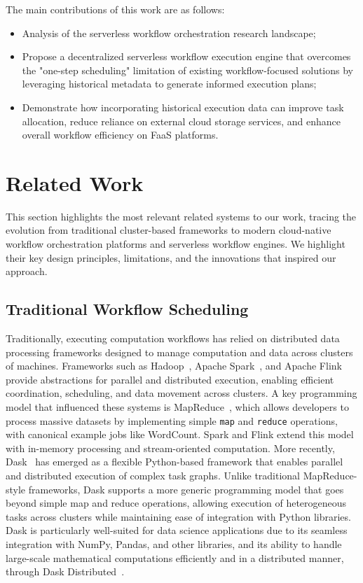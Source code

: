 \documentclass[conference]{IEEEtran}
\begin{document}
The main contributions of this work are as follows:
\begin{itemize}
    \item Analysis of the serverless workflow orchestration research landscape;
    \item Propose a decentralized serverless workflow execution engine that overcomes the "one-step scheduling" limitation of existing workflow-focused solutions by leveraging historical metadata to generate informed execution plans;
    \item Demonstrate how incorporating historical execution data can improve task allocation, reduce reliance on external cloud storage services, and enhance overall workflow efficiency on FaaS platforms.
\end{itemize}


\section{Related Work}
\label{s:related_work}

This section highlights the most relevant related systems to our work, tracing the evolution from traditional cluster-based frameworks to modern cloud-native workflow orchestration platforms and serverless workflow engines. We highlight their key design principles, limitations, and the innovations that inspired our approach.

\subsection{Traditional Workflow Scheduling}
Traditionally, executing computation workflows has relied on distributed data processing frameworks designed to manage computation and data across clusters of machines. Frameworks such as Hadoop~\cite{apache_hadoop}, Apache Spark~\cite{apache_spark}, and Apache Flink~\cite{apache_flink} provide abstractions for parallel and distributed execution, enabling efficient coordination, scheduling, and data movement across clusters. A key programming model that influenced these systems is MapReduce~\cite{mapreduce}, which allows developers to process massive datasets by implementing simple \texttt{map} and \texttt{reduce} operations, with canonical example jobs like WordCount. Spark and Flink extend this model with in-memory processing and stream-oriented computation. More recently, Dask~\cite{dask_python} has emerged as a flexible Python-based framework that enables parallel and distributed execution of complex task graphs. Unlike traditional MapReduce-style frameworks, Dask supports a more generic programming model that goes beyond simple map and reduce operations, allowing execution of heterogeneous tasks across clusters while maintaining ease of integration with Python libraries. Dask is particularly well-suited for data science applications due to its seamless integration with NumPy, Pandas, and other libraries, and its ability to handle large-scale mathematical computations efficiently and in a distributed manner, through Dask Distributed~\cite{dask_python_distributed}.
\end{document}

